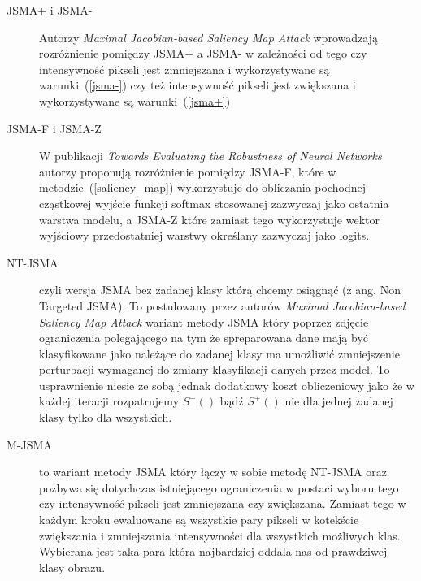 \documentclass[
    left=2.5cm,         %
    right=2.5cm,        %
    top=2.5cm,          %
    bottom=3cm,         %
    bindingoffset=6mm,  %
    nohyphenation=false %
]{eiti/eiti-thesis}
\begin{document}
\begin{description}
    \item[JSMA+ i JSMA-]
        Autorzy \textit{Maximal Jacobian-based Saliency Map Attack}\cite{DBLP:journals/corr/abs-1808-07945} wprowadzają rozróżnienie
        pomiędzy JSMA+ a JSMA- w zależności od tego czy intensywność pikseli jest zmniejszana i wykorzystywane są warunki~(\ref{jsma-})
        czy też intensywność pikseli jest zwiększana i wykorzystywane są warunki~(\ref{jsma+})
    \item[JSMA-F i JSMA-Z]
        W publikacji \textit{Towards Evaluating the Robustness of Neural Networks}\cite{DBLP:journals/corr/CarliniW16a}
        autorzy proponują rozróżnienie pomiędzy JSMA-F, które w metodzie~(\ref{saliency_map}) wykorzystuje do obliczania pochodnej cząstkowej
        wyjście funkcji softmax stosowanej zazwyczaj jako ostatnia warstwa modelu, a JSMA-Z które zamiast tego wykorzystuje wektor
        wyjściowy przedostatniej warstwy określany zazwyczaj jako logits.
    \item[NT-JSMA]
        czyli wersja JSMA bez zadanej klasy którą chcemy osiągnąć (z ang. Non Targeted JSMA). To postulowany przez autorów
        \textit{Maximal Jacobian-based Saliency Map Attack}\cite{DBLP:journals/corr/abs-1808-07945} wariant metody JSMA
        który poprzez zdjęcie ograniczenia polegającego na tym że spreparowana dane mają być klasyfikowane jako należące do zadanej
        klasy ma umożliwić zmniejszenie perturbacji wymaganej do zmiany klasyfikacji danych przez model. To usprawnienie niesie
        ze sobą jednak dodatkowy koszt obliczeniowy jako że w każdej iteracji rozpatrujemy $S^{-}()$ bądź $S^{+}()$ nie dla
        jednej zadanej klasy tylko dla wszystkich.
    \item[M-JSMA\cite{DBLP:journals/corr/abs-1808-07945}]
        to wariant metody JSMA który łączy w sobie metodę NT-JSMA oraz pozbywa się
        dotychczas istniejącego ograniczenia w postaci wyboru tego czy intensywność pikseli jest zmniejszana czy zwiększana.
        Zamiast tego w każdym kroku ewaluowane są wszystkie pary pikseli w kotekście zwiększania i zmniejszania intensywności
        dla wszystkich możliwych klas. Wybierana jest taka para która najbardziej oddala nas od prawdziwej klasy obrazu.
\end{description}
\end{document}
